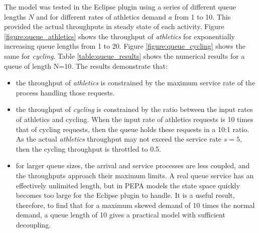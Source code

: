 \FloatBarrier
The model was tested in the Eclipse plugin using a series of different queue lengths $\mathit{N}$ and for different rates of athletics demand $\mathit{a}$ from 1 to 10.  This provided the actual throughputs in steady state of each activity.  Figure \ref{figure:queue_athletics} shows the throughput of {\itshape athletics} for exponentially increasing queue lengths from 1 to 20.  Figure \ref{figure:queue_cycling} shows the same for {\itshape cycling}.  Table \ref{table:queue_results} shows the numerical results for a queue of length N=10.
The results demonstrate that:
\begin{itemize}
	\item the throughput of {\itshape athletics} is constrained by the maximum service rate of the process handling those requests.
	\item the throughput of {\itshape cycling} is constrained by the ratio between the input rates of athletics and cycling.  When the input rate of athletics requests is 10 times that of cycling requests, then the queue holds these requests in a 10:1 ratio.  As the actual {\itshape athletics} throughput may not exceed the service rate $\mathit{s=5}$, then the cycling throughput is throttled to 0.5.
	\item for larger queue sizes, the arrival and service processes are less coupled, and the throughputs approach their maximum limits.  A real queue service has an effectively unlimited length, but in PEPA models the state space quickly becomes too large for the Eclipse plugin to handle.  It is a useful result, therefore, to find that for a maximum skewed demand of 10 times the normal demand, a queue length of 10 gives a practical model with sufficient decoupling.
\end{itemize}

